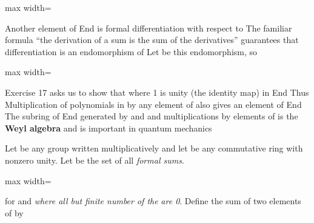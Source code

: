 \documentclass[11pt,oneside]{article}
\begin{document}
\begin{BookBody}
\begin{center}\begin{adjustbox}{max width=\linewidth}\end{adjustbox}\end{center}

\noindent Another element of End is formal differentiation with respect to The familiar formula “the derivation of a sum is the sum of the derivatives” guarantees that differentiation is an endomorphism of  Let  be this endomorphism, so

\begin{center}\begin{adjustbox}{max width=\linewidth}\end{adjustbox}\end{center}

\noindent Exercise 17 asks us to show that  where 1 is unity (the identity map) in End Thus  Multiplication of polynomials in  by any element of  also gives an element of End  The subring of End generated by  and  and multiplications by elements of  is the\textbf{ Weyl algebra} and is important in quantum mechanics\BookEnd{\blacktriangle}


\noindent Let  be any group written multiplicatively and let  be any commutative ring with nonzero unity. Let  be the set of all\textit{ formal sums}.

\begin{center}\begin{adjustbox}{max width=\linewidth}\end{adjustbox}\end{center}

\noindent for  and  \textit{where all but}  \textit{finite number of the}  \textit{are 0}. Define the sum of two elements of  by


\end{BookBody}
\end{document}

